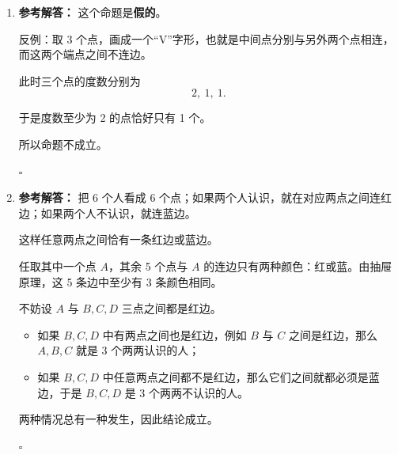 \documentclass[11pt,a4paper,fontset=fandol]{ctexart}
\newenvironment{solution}{\par\noindent\textbf{参考解答：}}{\hfill$\square$\par}
\begin{document}
\begin{enumerate}
  \item \begin{solution}
  这个命题是\textbf{假的}。

  反例：取 3 个点，画成一个“V”字形，也就是中间点分别与另外两个点相连，而这两个端点之间不连边。

  此时三个点的度数分别为
  \[
  2,\ 1,\ 1.
  \]

  于是度数至少为 2 的点恰好只有 1 个。

  所以命题不成立。

  \begin{center}
  \end{center}
  \end{solution}

  \item \begin{solution}
  把 6 个人看成 6 个点；如果两个人认识，就在对应两点之间连红边；如果两个人不认识，就连蓝边。

  这样任意两点之间恰有一条红边或蓝边。

  任取其中一个点 $A$，其余 5 个点与 $A$ 的连边只有两种颜色：红或蓝。由抽屉原理，这 5 条边中至少有 3 条颜色相同。

  不妨设 $A$ 与 $B,C,D$ 三点之间都是红边。

  \begin{itemize}
    \item 如果 $B,C,D$ 中有两点之间也是红边，例如 $B$ 与 $C$ 之间是红边，那么 $A,B,C$ 就是 3 个两两认识的人；
    \item 如果 $B,C,D$ 中任意两点之间都不是红边，那么它们之间就都必须是蓝边，于是 $B,C,D$ 是 3 个两两不认识的人。
  \end{itemize}

  两种情况总有一种发生，因此结论成立。


\end{solution}
\end{enumerate}
\end{document}
